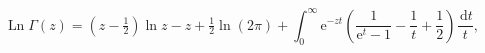 \[\operatorname{Ln}\Gamma\left(z\right)=\left(z-\tfrac{1}{2}\right)\ln z-z+%
\tfrac{1}{2}\ln\left(2\pi\right)+\int_{0}^{\infty}{\mathrm{e}}^{-zt}\left(%
\frac{1}{{\mathrm{e}}^{t}-1}-\frac{1}{t}+\frac{1}{2}\right)\frac{\,\mathrm{d}t%
}{t},\]